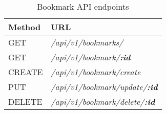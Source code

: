 \begin{table}[!h]
    \centering
    \caption{Bookmark API endpoints}
    \label{tab:bookmark-api}
    \begin{tabular}{|l|p{29em}|}
        \hline
        \textbf{Method} & \textbf{URL} \\
        \hline
        GET & \textit{/api/v1/bookmarks/} \\
        \hline
        GET & \textit{/api/v1/bookmark/\textbf{:id}} \\
        \hline
        CREATE & \textit{/api/v1/bookmark/create} \\
        \hline
        PUT & \textit{/api/v1/bookmark/update/\textbf{:id}} \\
        \hline
        DELETE & \textit{/api/v1/bookmark/delete/\textbf{:id}} \\
        \hline
    \end{tabular}
\end{table}
